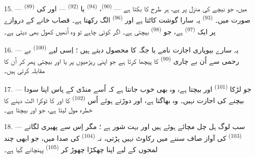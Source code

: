 \VUsaut{4.0mm}
\VUsaut{3.0mm}

15. ---  \textsuperscript{(89)} میں، جو نیچے کی
منزل پر ہے، ہر طرح کا  بکتا ہے — 
\textsuperscript{(90)}،  \textsuperscript{(94)}
یا  \textsuperscript{(92)} — 
  اور  کی
صورت میں۔  \textsuperscript{(93)} یہ سارا گوشت
کاٹتا ہے اور  \textsuperscript{(96)} الگ رکھتا
ہے۔ قصاب خانے کے دروازے پر ایک 
\textsuperscript{(97)} ہے، جو  \textsuperscript{(98)}
بیچتی ہے۔ اگر کوئی چاہے تو وہ اُنھیں کھول بھی دیتی ہے۔

16. --- یہ سارے بیوپاری اجازت نامے یا جگہ کا محصول دیتے ہیں ؛ اِسی
لیے  \textsuperscript{(100)} بے رحمی سے اُن بے
چاری  \textsuperscript{(99)} کا پیچھا
کرتا ہے جو اپنی ریڑھیوں پر  
  یا 
    اور  بیچتی پھر کر اُن کا مقابلہ کرتی ہیں۔

\VUsaut{4.0mm}
\VUsaut{3.0mm}

17. --- جو لڑکا  \textsuperscript{(101)} اور
 بیچتا ہے، وہ بھی خوب جانتا ہے کہ اُسے منڈی کے پاس اپنا
سودا بیچنے کی اجازت نہیں۔ وہ بھاگتا ہے، اور دوڑتے ہوئے اُس
 \textsuperscript{(102)} کا 
 اور  کا ٹوکرا الٹ دینے کا خطرہ
مول لیتا ہے، جو  اور  بیچتا ہے۔

18. --- سب لوگ ہل چل مچائے ہوئے ہیں اور بہت شور ہے ؛ مگر اِس سے
پھیری لگاتے  \textsuperscript{(103)} کی آواز صاف
سننے میں رکاوٹ نہیں پڑتی، نہ 
\textsuperscript{(104)} کی صدا میں، جو ابھی چند لمحوں کے لیے اپنا
چھکڑا چھوڑ کر  \textsuperscript{(105)} پہنچانے
گیا ہے۔

\VUsaut{6.0mm}
\VUfilet{22mm}
